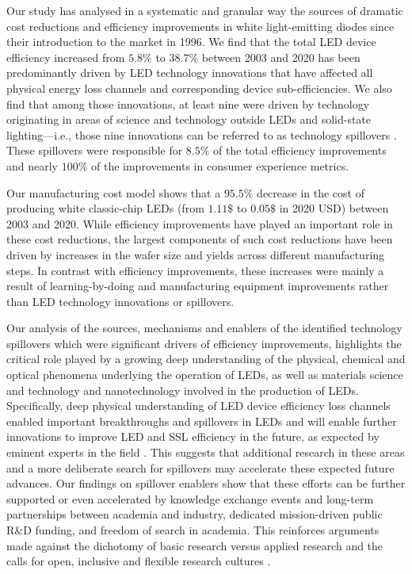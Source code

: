 \documentclass[twoside,twocolumn,9pt]{article}
\begin{document}
Our study has analysed in a systematic and granular way the sources of dramatic cost reductions and efficiency improvements in white light-emitting diodes since their introduction to the market in 1996. We find that the total LED device efficiency increased from $5.8\%$ to $38.7\%$ between 2003 and 2020 has been predominantly driven by LED technology innovations that have affected all physical energy loss channels and corresponding device sub-efficiencies. We also find that among those innovations, at least nine were driven by technology originating in areas of science and technology outside LEDs and solid-state lighting—i.e., those nine innovations can be referred to as technology spillovers . These spillovers were responsible for $8.5\%$ of the total efficiency improvements and nearly $100\%$ of the improvements in consumer experience metrics. 

Our manufacturing cost model shows that a $95.5\%$ decrease in the cost of producing white classic-chip LEDs (from $1.11\$$ to $0.05\$$ in 2020 USD) between 2003 and 2020. While efficiency improvements have played an important role in these cost reductions, the largest components of such cost reductions have been driven by increases in the wafer size and yields across different manufacturing steps. In contrast with efficiency improvements, these increases were mainly a result of learning-by-doing and manufacturing equipment improvements rather than LED technology innovations or spillovers. 

Our analysis of the sources, mechanisms and enablers of the identified technology spillovers which were significant drivers of efficiency improvements, highlights the critical role played by a growing deep understanding of the physical, chemical and optical phenomena underlying the operation of LEDs, as well as materials science and technology and nanotechnology involved in the production of LEDs. Specifically, deep physical understanding of LED device efficiency loss channels enabled important breakthroughs and spillovers in LEDs and will enable further innovations to improve LED and SSL efficiency in the future, as expected by eminent experts in the field \cite{Weisbuch2020}. This suggests that additional research in these areas and a more deliberate search for spillovers may accelerate these expected future advances. Our findings on spillover enablers show that these efforts can be further supported or even accelerated by knowledge exchange events and long-term partnerships between academia and industry, dedicated mission-driven public R\&D funding, and freedom of search in academia. This reinforces arguments made against the dichotomy of basic research versus applied research \cite{narayanamurti2016cycles} \cite{narayanamurti2021genesis} and the calls for open, inclusive and flexible research cultures \cite{Stephan2021}.
\end{document}
